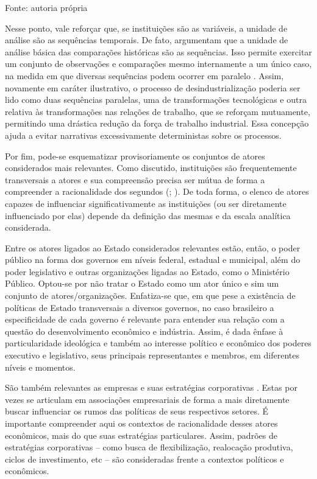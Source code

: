 Fonte: autoria própria

Nesse ponto, vale reforçar que, se instituições são as variáveis, a
unidade de análise são as sequências temporais. De fato,
\citet{mahoneyfalleti2015} argumentam que a unidade de análise básica
das comparações históricas são as sequências. Isso permite exercitar um
conjunto de observações e comparações mesmo internamente a um único
caso, na medida em que diversas sequências podem ocorrer em paralelo
\citep{mahoneyfalleti2015}. Assim, novamente em caráter ilustrativo, o
processo de desindustrialização poderia ser lido como duas sequências
paralelas, uma de transformações tecnológicas e outra relativa às
transformações nas relações de trabalho, que se reforçam mutuamente,
permitindo uma drástica redução da força de trabalho industrial. Essa
concepção ajuda a evitar narrativas excessivamente deterministas sobre
os processos.

Por fim, pode-se esquematizar provisoriamente os conjuntos de atores
considerados mais relevantes. Como discutido, instituições são
frequentemente transversais a atores e sua compreensão precisa ser
mútua de forma a compreender a racionalidade dos segundos
(; ). De toda forma, o elenco
de atores capazes de influenciar significativamente as instituições (ou
ser diretamente influenciado por elas) depende da definição das mesmas
e da escala analítica considerada.

Entre os atores ligados ao Estado considerados relevantes estão, então,
o poder público na forma dos governos em níveis federal, estadual e
municipal, além do poder legislativo e outras organizações ligadas ao
Estado, como o Ministério Público. Optou-se por não tratar o Estado como
um ator único e sim um conjunto de atores/organizações. Enfatiza-se que,
em que pese a existência de políticas de Estado transversais a diversos
governos, no caso brasileiro a especificidade de cada governo é
relevante para entender sua relação com a questão do desenvolvimento
econômico e indústria. Assim, é dada ênfase à particularidade
ideológica e também ao interesse político e econômico dos poderes
executivo e legislativo, seus principais representantes e membros, em
diferentes níveis e momentos.

São também relevantes as empresas e suas estratégias corporativas
. Estas por vezes se articulam em
associações empresariais de forma a mais diretamente buscar influenciar
os rumos das políticas de seus respectivos setores. É importante
compreender aqui os contextos de racionalidade desses atores
econômicos, mais do que suas estratégias particulares. Assim, padrões
de estratégias corporativas -- como busca de flexibilização, realocação
produtiva, ciclos de investimento, etc -- são consideradas frente a
contextos políticos e econômicos.

